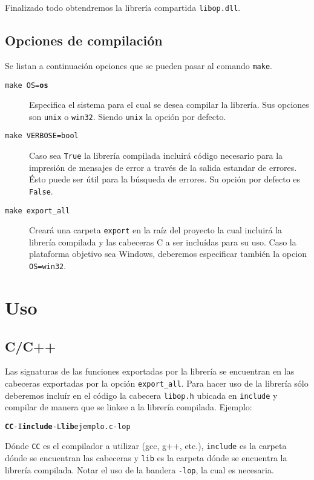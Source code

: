 \documentclass[12pt,a4paper,final]{article}
\begin{document}
			Finalizado todo obtendremos la librería compartida \texttt{libop.dll}.

	\subsection{Opciones de compilación}
		Se listan a continuación opciones que se pueden pasar al comando \texttt{make}.

		\begin{description}
			\item [\texttt{make OS=\textbf{os}}] Especifica el sistema para el cual se desea compilar la librería.
				Sus opciones son \texttt{unix} o \texttt{win32}. Siendo \texttt{unix} la opción por defecto.
			\item [\texttt{make VERBOSE=bool}] Caso sea \texttt{True} la librería compilada incluirá código
				necesario para la impresión de mensajes de error a través de la salida estandar de errores. Ésto
				puede ser útil para la búsqueda de errores. Su opción por defecto es \texttt{False}.
			\item [\texttt{make export\_all}] Creará una carpeta \texttt{export} en la raíz del proyecto la
				cual incluirá la librería compilada y las cabeceras C a ser incluídas para su uso. Caso la
				plataforma objetivo sea Windows, deberemos especificar también la opcion \texttt{OS=win32}.
		\end{description}

\section{Uso}
	\subsection{C/C++}
		Las signaturas de las funciones exportadas por la librería se encuentran en las cabeceras
		exportadas por la opción \texttt{export\_all}. Para hacer uso de la librería sólo deberemos incluír
		en el código la cabecera \texttt{libop.h} ubicada en \texttt{include} y compilar de manera que se linkee
		a la librería compilada. Ejemplo:

		\begin{alltt}
			\textbf{CC} -I\textbf{include} -L\textbf{lib} ejemplo.c -lop
		\end{alltt}

		Dónde \texttt{CC} es el compilador a utilizar (gcc, g++, etc.), \texttt{include} es la carpeta dónde
		se encuentran las cabeceras y \texttt{lib} es la carpeta dónde se encuentra la librería compilada.
		Notar el uso de la bandera \texttt{-lop}, la cual es necesaria.
\end{document}
